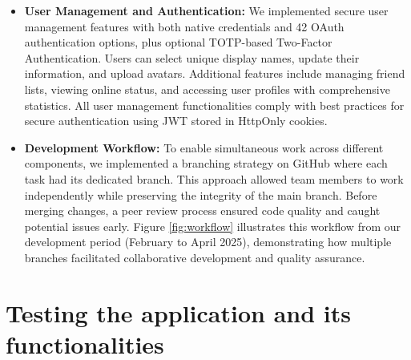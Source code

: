\begin{itemize}
    \item \textbf{User Management and Authentication:} We implemented secure user management features with both native credentials and 42 OAuth authentication options, plus optional TOTP-based Two-Factor Authentication. Users can select unique display names, update their information, and upload avatars. Additional features include managing friend lists, viewing online status, and accessing user profiles with comprehensive statistics. All user management functionalities comply with best practices for secure authentication using JWT stored in HttpOnly cookies.
    
    \item \textbf{Development Workflow:} To enable simultaneous work across different components, we implemented a branching strategy on GitHub where each task had its dedicated branch. This approach allowed team members to work independently while preserving the integrity of the main branch. Before merging changes, a peer review process ensured code quality and caught potential issues early. Figure \ref{fig:workflow} illustrates this workflow from our development period (February to April 2025), demonstrating how multiple branches facilitated collaborative development and quality assurance.
\end{itemize}

\section{Testing the application and its functionalities}

